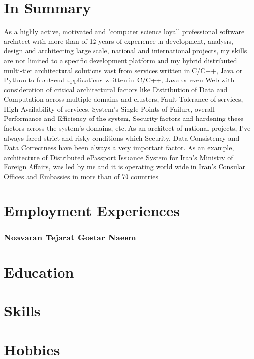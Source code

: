 \documentclass[10pt,a4paper]{article}
\begin{document}
\thispagestyle{fancy}

\section{In Summary}
As a highly active, motivated and 'computer science loyal' professional software architect with more than of 12 years of experience in development, analysis, design and architecting large scale, national and international projects, my skills are not limited to a specific development platform and my hybrid distributed multi-tier architectural solutions vast from services written in C/C++, Java or Python to front-end applications written in C/C++, Java or even Web with consideration of critical architectural factors like Distribution of Data and Computation across multiple domains and clusters, Fault Tolerance of services, High Availability of services, System's Single Points of Failure, overall Performance and Efficiency of the system, Security factors and hardening these factors across the system's domains, etc. As an architect of national projects, I've always faced strict and risky conditions which Security, Data Consistency and Data Correctness have been always a very important factor. As an example, architecture of Distributed ePassport Issuance System for Iran's Ministry of Foreign Affairs, was led by me and it is operating world wide in Iran's Consular Offices and Embassies in more than of 70 countries.

\section{Employment Experiences}
\subsubsection{Noavaran Tejarat Gostar Naeem}

\section{Education}

\section{Skills}

\section{Hobbies}
\end{document}
